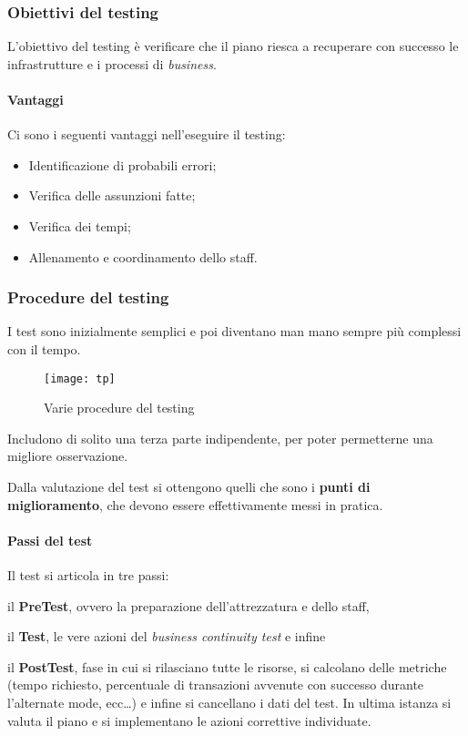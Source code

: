 \subsubsection{Obiettivi del testing}

L'obiettivo del testing è verificare che il piano riesca a recuperare con
successo le infrastrutture e i processi di \textit{business}.

\paragraph*{Vantaggi} Ci sono i seguenti vantaggi nell'eseguire il testing:
\begin{itemize}
  \item Identificazione di probabili errori;
  \item Verifica delle assunzioni fatte;
  \item Verifica dei tempi;
  \item Allenamento e coordinamento dello staff.
\end{itemize}

\subsubsection{Procedure del testing}

I test sono inizialmente semplici e poi diventano man mano sempre più complessi
con il tempo.

\begin{figure}[H]
 \centering
 \texttt{[image: tp]}
 \caption{Varie procedure del testing}
\end{figure}

Includono di solito una terza parte indipendente, per poter permetterne una
migliore osservazione.

Dalla valutazione del test si ottengono quelli che sono i \textbf{punti di
miglioramento}, che devono essere effettivamente messi in pratica.

\paragraph*{Passi del test} Il test si articola in tre passi:
\begin{enumerate*}[label=\arabic*)]
\item il \textbf{PreTest}, ovvero la preparazione dell'attrezzatura e
dello staff, 
\item il \textbf{Test}, le vere azioni del \textit{business continuity
test} e infine
\item il \textbf{PostTest}, fase in cui si rilasciano tutte le risorse,
si calcolano delle metriche (tempo richiesto, percentuale di transazioni
avvenute con successo durante l'alternate mode, ecc\dots) e 
infine si cancellano i dati del test. In ultima istanza si valuta il
piano e si implementano le azioni correttive individuate.
\end{enumerate*}

